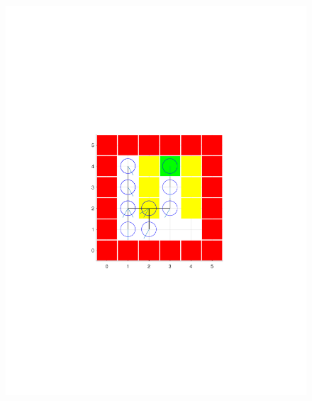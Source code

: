 \documentclass{article}
\begin{document}
\begin{figure}[h!]
\begin{minipage}{0.4\textwidth}
{			\includegraphics[trim={5cm 9cm 3cm 9cm},clip,scale = 0.55]{plots/Probabilistic/5a22.pdf}
			\label{fig:subfig2}} 
		

\end{minipage}
\end{figure}
\end{document}
